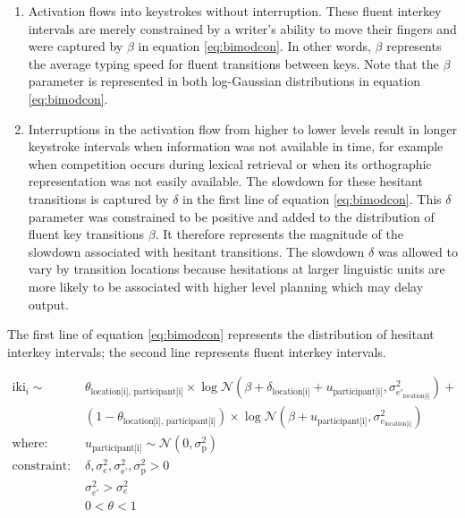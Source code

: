 \documentclass[
  man,floatsintext]{apa7}
\begin{document}
\begin{enumerate}
\def\labelenumi{\arabic{enumi}.}
\item
  Activation flows into keystrokes without interruption. These fluent interkey intervals are merely constrained by a writer's ability to move their fingers and were captured by \(\beta\) in equation \ref{eq:bimodcon}. In other words, \(\beta\) represents the average typing speed for fluent transitions between keys. Note that the \(\beta\) parameter is represented in both log-Gaussian distributions in equation \ref{eq:bimodcon}.
\item
  Interruptions in the activation flow from higher to lower levels result in longer keystroke intervals when information was not available in time, for example when competition occurs during lexical retrieval or when its orthographic representation was not easily available. The slowdown for these hesitant transitions is captured by \(\delta\) in the first line of equation \ref{eq:bimodcon}. This \(\delta\) parameter was constrained to be positive and added to the distribution of fluent key transitions \(\beta\). It therefore represents the magnitude of the slowdown associated with hesitant transitions. The slowdown \(\delta\) was allowed to vary by transition locations because hesitations at larger linguistic units are more likely to be associated with higher level planning which may delay output.
\end{enumerate}

The first line of equation \ref{eq:bimodcon} represents the distribution of hesitant interkey intervals; the second line represents fluent interkey intervals.

\begin{equation}
\begin{aligned}
\label{eq:bimodcon}
\text{iki}_{i} \sim\text{ } & \theta_\text{location[i], participant[i]} \times \log\mathcal{N}(\beta + \delta_\text{location[i]} + u_\text{participant[i]}, \sigma_{e'_\text{location[i]}}^2) + \\
  & (1 - \theta_\text{location[i], participant[i]}) \times \log\mathcal{N}(\beta + u_\text{participant[i]}, \sigma_{e_\text{location[i]}}^2)\\
\text{where: } & u_\text{participant[i]} \sim \mathcal{N}(0, \sigma_\text{p}^2) \\
\text{constraint: } & \delta, \sigma_{e}^2, \sigma_\text{e'}^2, \sigma_\text{p}^2>0\\
        & \sigma_{e'}^2 > \sigma_{e}^2\\
        & 0 < \theta < 1
\end{aligned}
\end{equation}
\end{document}
